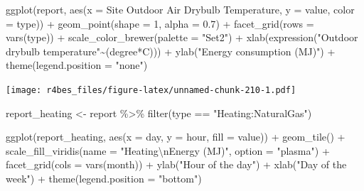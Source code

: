 \documentclass[
]{book}
\newenvironment{Shaded}{\begin{snugshade}}{\end{snugshade}}
\newcommand{\AttributeTok}[1]{\textcolor[rgb]{0.77,0.63,0.00}{#1}}
\newcommand{\DecValTok}[1]{\textcolor[rgb]{0.00,0.00,0.81}{#1}}
\newcommand{\FloatTok}[1]{\textcolor[rgb]{0.00,0.00,0.81}{#1}}
\newcommand{\FunctionTok}[1]{\textcolor[rgb]{0.00,0.00,0.00}{#1}}
\newcommand{\NormalTok}[1]{#1}
\newcommand{\OtherTok}[1]{\textcolor[rgb]{0.56,0.35,0.01}{#1}}
\newcommand{\SpecialCharTok}[1]{\textcolor[rgb]{0.00,0.00,0.00}{#1}}
\newcommand{\StringTok}[1]{\textcolor[rgb]{0.31,0.60,0.02}{#1}}
\begin{document}
\begin{Shaded}
\begin{Highlighting}[]
\FunctionTok{ggplot}\NormalTok{(report, }\FunctionTok{aes}\NormalTok{(}\AttributeTok{x =} \StringTok{\textasciigrave{}}\AttributeTok{Site Outdoor Air Drybulb Temperature}\StringTok{\textasciigrave{}}\NormalTok{,}
                   \AttributeTok{y =}\NormalTok{ value,}
                   \AttributeTok{color =}\NormalTok{ type)) }\SpecialCharTok{+}
  \FunctionTok{geom\_point}\NormalTok{(}\AttributeTok{shape =} \DecValTok{1}\NormalTok{, }\AttributeTok{alpha =} \FloatTok{0.7}\NormalTok{) }\SpecialCharTok{+}
  \FunctionTok{facet\_grid}\NormalTok{(}\AttributeTok{rows =} \FunctionTok{vars}\NormalTok{(type)) }\SpecialCharTok{+}
  \FunctionTok{scale\_color\_brewer}\NormalTok{(}\AttributeTok{palette =} \StringTok{"Set2"}\NormalTok{) }\SpecialCharTok{+}
  \FunctionTok{xlab}\NormalTok{(}\FunctionTok{expression}\NormalTok{(}\StringTok{"Outdoor drybulb temperature"}\SpecialCharTok{\textasciitilde{}}\NormalTok{(degree}\SpecialCharTok{*}\NormalTok{C))) }\SpecialCharTok{+}
  \FunctionTok{ylab}\NormalTok{(}\StringTok{"Energy consumption (MJ)"}\NormalTok{) }\SpecialCharTok{+}
  \FunctionTok{theme}\NormalTok{(}\AttributeTok{legend.position =} \StringTok{"none"}\NormalTok{)}
\end{Highlighting}
\end{Shaded}

\texttt{[image: r4bes\_files/figure-latex/unnamed-chunk-210-1.pdf]}

\begin{Shaded}
\begin{Highlighting}[]

\NormalTok{report\_heating }\OtherTok{\textless{}{-}}\NormalTok{ report }\SpecialCharTok{\%\textgreater{}\%}
  \FunctionTok{filter}\NormalTok{(type }\SpecialCharTok{==} \StringTok{"Heating:NaturalGas"}\NormalTok{)}

\FunctionTok{ggplot}\NormalTok{(report\_heating, }\FunctionTok{aes}\NormalTok{(}\AttributeTok{x =}\NormalTok{ day, }\AttributeTok{y =}\NormalTok{ hour, }
                           \AttributeTok{fill =}\NormalTok{ value)) }\SpecialCharTok{+}
  \FunctionTok{geom\_tile}\NormalTok{() }\SpecialCharTok{+}
  \FunctionTok{scale\_fill\_viridis}\NormalTok{(}\AttributeTok{name =} \StringTok{"Heating}\SpecialCharTok{\textbackslash{}n}\StringTok{Energy (MJ)"}\NormalTok{,}
                     \AttributeTok{option =} \StringTok{"plasma"}\NormalTok{) }\SpecialCharTok{+}
  \FunctionTok{facet\_grid}\NormalTok{(}\AttributeTok{cols =} \FunctionTok{vars}\NormalTok{(month)) }\SpecialCharTok{+}
  \FunctionTok{ylab}\NormalTok{(}\StringTok{"Hour of the day"}\NormalTok{) }\SpecialCharTok{+}
  \FunctionTok{xlab}\NormalTok{(}\StringTok{"Day of the week"}\NormalTok{) }\SpecialCharTok{+}
  \FunctionTok{theme}\NormalTok{(}\AttributeTok{legend.position =} \StringTok{"bottom"}\NormalTok{)}
\end{Highlighting}
\end{Shaded}
\end{document}
